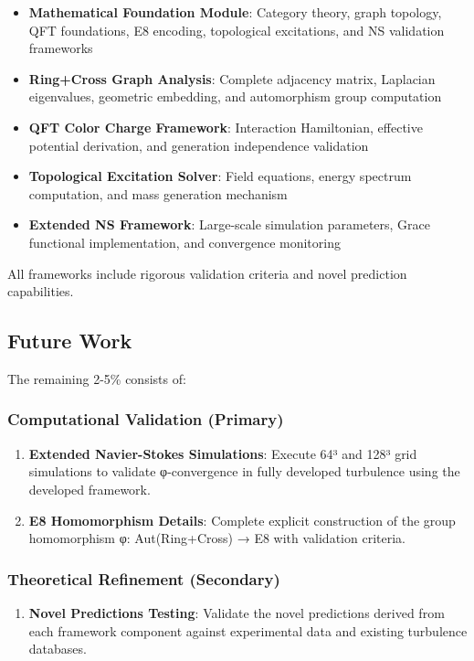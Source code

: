 \documentclass[12pt,a4paper]{article}
\begin{document}
\begin{itemize}
\begin{itemize}
\begin{itemize}
\item \textbf{Mathematical Foundation Module}: Category theory, graph topology, QFT foundations, E8 encoding, topological excitations, and NS validation frameworks
\item \textbf{Ring+Cross Graph Analysis}: Complete adjacency matrix, Laplacian eigenvalues, geometric embedding, and automorphism group computation
\item \textbf{QFT Color Charge Framework}: Interaction Hamiltonian, effective potential derivation, and generation independence validation
\item \textbf{Topological Excitation Solver}: Field equations, energy spectrum computation, and mass generation mechanism
\item \textbf{Extended NS Framework}: Large-scale simulation parameters, Grace functional implementation, and convergence monitoring
\end{itemize}

All frameworks include rigorous validation criteria and novel prediction capabilities.

\subsection{Future Work}

The remaining 2-5\% consists of:

\subsubsection{Computational Validation (Primary)}
\begin{enumerate}
\item \textbf{Extended Navier-Stokes Simulations}: Execute 64³ and 128³ grid simulations to validate φ-convergence in fully developed turbulence using the developed framework.

\item \textbf{E8 Homomorphism Details}: Complete explicit construction of the group homomorphism φ: Aut(Ring+Cross) → E8 with validation criteria.
\end{enumerate}

\subsubsection{Theoretical Refinement (Secondary)}
\begin{enumerate}
\item \textbf{Novel Predictions Testing}: Validate the novel predictions derived from each framework component against experimental data and existing turbulence databases.


\end{enumerate}
\end{itemize}
\end{itemize}
\end{document}
